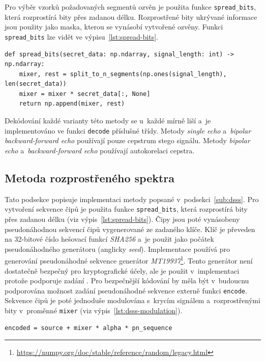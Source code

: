 Pro výběr vzorků požadovaných segmentů ozvěn je použita funkce
\texttt{spread\_bits}, která rozprostírá bity přes zadanou délku. Rozprostřené
bity ukrývané informace jsou použity jako maska, kterou se vynásobí vytvořené
ozvěny. Funkci \texttt{spread\_bits} lze vidět ve výpisu~\ref{lst:spread-bits}.

\begin{lstlisting}[language=PythonPlus, label={lst:spread-bits},
caption={Funkce pro rozprostření bitů na zadanou délku.}]
def spread_bits(secret_data: np.ndarray, signal_length: int) -> np.ndarray:
    mixer, rest = split_to_n_segments(np.ones(signal_length), len(secret_data))
    mixer = mixer * secret_data[:, None]
    return np.append(mixer, rest)
\end{lstlisting}

Dekódování každé varianty této metody se u~každé mírně liší a~je implementováno
ve funkci \texttt{decode} příslušné třídy. Metody \textit{single echo}
a~\textit{bipolar backward-forward echo} používají pouze cepstrum stego
signálu. Metody \textit{bipolar echo} a~\textit{backward-forward echo}
používají autokorelaci cepstra.

\subsection*{Metoda rozprostřeného spektra}
\label{sub:dsss-implementation}

Tato podsekce popisuje implementaci metody popsané v~podsekci~\ref{sub:dsss}.
Pro vytvoření sekvence čipů je použita funkce \texttt{spread\_bits}, která
rozprostírá bity přes zadanou délku (viz výpis~\ref{lst:spread-bits}). Čipy
jsou poté vynásobeny pseudonáhodnou sekvencí čipů vygenerované ze zadaného
klíče. Klíč je převeden na 32-bitové číslo hešovací funkcí \textit{SHA256} a~je
použit jako počátek pseudonáhodného generátoru (anglicky \textit{seed}).
Implementace používá pro generování pseudonáhodné sekvence generátor
\textit{MT19937}\footnote{\url{https://numpy.org/doc/stable/reference/random/legacy.html}}.
Tento generátor není dostatečně bezpečný pro kryptografické účely, ale je
použit v~implementaci protože podporuje zadání . Pro bezpečnější
kódování by měla být v~budoucnu podporována možnost zadání pseudonáhodné
sekvence externě funkci \texttt{encode}. Sekvence čipů je poté jednoduše
modulována s~krycím signálem a~rozprostřenými bity v~proměnné \texttt{mixer}
(viz výpis~\ref{lst:dsss-modulation}).

\begin{lstlisting}[language=PythonPlus, label={lst:dsss-modulation},
caption={Modulace krycího signálu, rozprostřených bitů a~pseudonáhodné sekvence
čipů.}]
encoded = source + mixer * alpha * pn_sequence
\end{lstlisting}

